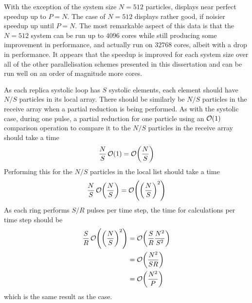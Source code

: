 %
With the exception of the system size $N = 512$ particles,
displays near perfect speedup up to $P = N$.
%
The case of $N = 512$ displays rather good, if noisier speedup up
until $P = N$.
%
The most remarkable aspect of this data is that the $N = 512$ system can
be run up to $4096$ cores while still producing some
improvement in performance,
and actually run on $32768$ cores, albeit with a drop
in performance.
%
It appears that the speedup is improved for each system size over all of
the other parallelisation schemes presented in this dissertation
and can be run well on an order of magnitude more cores.

%
As each replica systolic loop has $S$ systolic elements, each element
should have $N/S$ particles in its local array.
%
There should be similarly be $N/S$ particles in the receive array when
a partial reduction is being performed.
%
As with the systolic case, during one pulse, a partial reduction for one
particle using an $\mathcal{O}{\left({ 1 }\right)}$ comparison operation to compare it to the
$N/S$ particles in the receive array should take a time
\begin{equation}
    \frac{N}{S}\,\mathcal{O}{\left({ 1 }\right)} = \mathcal{O}{\left({ \frac{N}{S} }\right)}
\end{equation}
%
Performing this for the $N/S$ particles in the local list should take a time
\begin{equation}
    \frac{N}{S}\,\mathcal{O}{\left({ \frac{N}{S} }\right)} = \mathcal{O}{\left({ \left( \frac{N}{S} \right)^2 }\right)}
\end{equation}
%
As each ring performs $S/R$ pulses per time step, the time for calculations
per time step should be
\begin{equation}
    \label{eqn:replicated_systolic_pair_operation_calculation_time}
    \begin{split}
        \frac{S}{R}\,\mathcal{O}{\left({ \left( \frac{N}{S} \right)^2 }\right)}
            &= \mathcal{O}{\left({ \frac{S}{R} \frac{N^2}{S^2} }\right)} \\
            &= \mathcal{O}{\left({ \frac{N^2}{SR} }\right)} \\
            &= \mathcal{O}{\left({ \frac{N^2}{P} }\right)}
    \end{split}
\end{equation}
which is the same result as the \systolicloop{} case.


